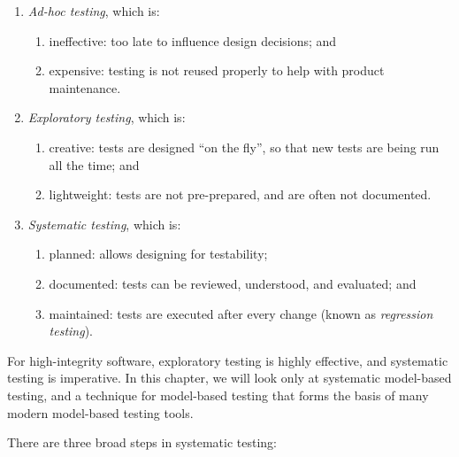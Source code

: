 \begin{enumerate}

 \item {\em Ad-hoc testing}, which is:

   \begin{enumerate}
     \item  ineffective: too late to influence design decisions; and

       \item expensive: testing is not reused properly to help with          product maintenance.

   \end{enumerate}

 \item \emph{Exploratory testing}, which  is:

   \begin{enumerate}
    \item creative: tests are designed ``on the fly'', so that new tests are being run all the time; and
    \item lightweight: tests are not pre-prepared, and are often not documented.
   \end{enumerate}


 \item {\em Systematic testing}, which is:

   \begin{enumerate}

     \item planned: allows designing for testability;
     \item documented: tests can be reviewed, understood, and evaluated; and
     \item maintained: tests are executed after every change (known as {\em regression testing}).

   \end{enumerate}

\end{enumerate}

For high-integrity software, exploratory testing is highly effective, and systematic testing is imperative. In this chapter, we will look only at systematic model-based testing, and a technique for model-based testing that forms the basis of many modern model-based testing tools.


There are three broad steps in systematic testing:


